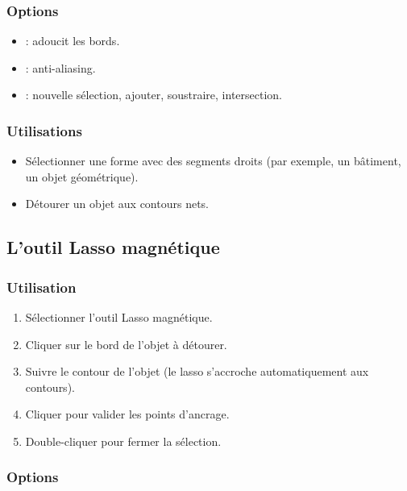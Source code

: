 \subsubsection{Options}

\begin{itemize}
    \item {} : adoucit les bords.
    \item {} : anti-aliasing.
    \item {} : nouvelle sélection, ajouter, soustraire, intersection.
\end{itemize}

\subsubsection{Utilisations}

\begin{itemize}
    \item Sélectionner une forme avec des segments droits (par exemple, un bâtiment, un objet géométrique).
    \item Détourer un objet aux contours nets.
\end{itemize}

\subsection{L'outil Lasso magnétique}

\subsubsection{Utilisation}

\begin{enumerate}
    \item Sélectionner l'outil Lasso magnétique.
    \item Cliquer sur le bord de l'objet à détourer.
    \item Suivre le contour de l'objet (le lasso s'accroche automatiquement aux contours).
    \item Cliquer pour valider les points d'ancrage.
    \item Double-cliquer pour fermer la sélection.
\end{enumerate}

\subsubsection{Options}


